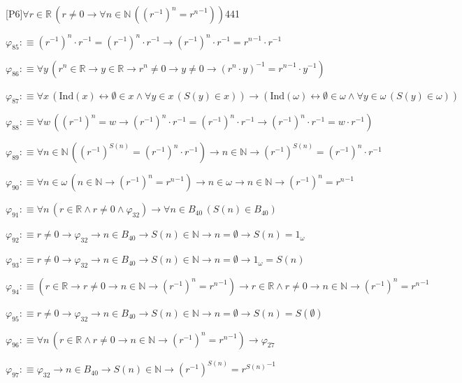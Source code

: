 \begin{fullproof}{[P6]}{$\forall r \in \mathbb{R}\,(r \neq 0 \to \forall n \in \mathbb{N}\,({{(r^{-1})}^{n}} = {{r}^{n}}^{-1}))$}{441}
\begin{abbrevlist}
\item $\varphi_{85} :\equiv {{(r^{-1})}^{n}} \cdot r^{-1} = {{(r^{-1})}^{n}} \cdot r^{-1} \to {{(r^{-1})}^{n}} \cdot r^{-1} = {{r}^{n}}^{-1} \cdot r^{-1}$
\item $\varphi_{86} :\equiv \forall y\,({{r}^{n}} \in \mathbb{R} \to y \in \mathbb{R} \to {{r}^{n}} \neq 0 \to y \neq 0 \to ({{r}^{n}} \cdot y)^{-1} = {{r}^{n}}^{-1} \cdot y^{-1})$
\item $\varphi_{87} :\equiv \forall x\,(\mathrm{Ind}(x) \leftrightarrow \emptyset \in x \land \forall y \in x\,(S(y) \in x)) \to (\mathrm{Ind}(\omega) \leftrightarrow \emptyset \in \omega \land \forall y \in \omega\,(S(y) \in \omega))$
\item $\varphi_{88} :\equiv \forall w\,({{(r^{-1})}^{n}} = w \to {{(r^{-1})}^{n}} \cdot r^{-1} = {{(r^{-1})}^{n}} \cdot r^{-1} \to {{(r^{-1})}^{n}} \cdot r^{-1} = w \cdot r^{-1})$
\item $\varphi_{89} :\equiv \forall n \in \mathbb{N}\,({{(r^{-1})}^{S(n)}} = {{(r^{-1})}^{n}} \cdot r^{-1}) \to n \in \mathbb{N} \to {{(r^{-1})}^{S(n)}} = {{(r^{-1})}^{n}} \cdot r^{-1}$
\item $\varphi_{90} :\equiv \forall n \in \omega\,(n \in \mathbb{N} \to {{(r^{-1})}^{n}} = {{r}^{n}}^{-1}) \to n \in \omega \to n \in \mathbb{N} \to {{(r^{-1})}^{n}} = {{r}^{n}}^{-1}$
\item $\varphi_{91} :\equiv \forall n\,(r \in \mathbb{R} \land r \neq 0 \land \varphi_{32}) \to \forall n \in B_{40}\,(S(n) \in B_{40})$
\item $\varphi_{92} :\equiv r \neq 0 \to \varphi_{32} \to n \in B_{40} \to S(n) \in \mathbb{N} \to n = \emptyset \to S(n) = 1_{\omega}$
\item $\varphi_{93} :\equiv r \neq 0 \to \varphi_{32} \to n \in B_{40} \to S(n) \in \mathbb{N} \to n = \emptyset \to 1_{\omega} = S(n)$
\item $\varphi_{94} :\equiv (r \in \mathbb{R} \to r \neq 0 \to n \in \mathbb{N} \to {{(r^{-1})}^{n}} = {{r}^{n}}^{-1}) \to r \in \mathbb{R} \land r \neq 0 \to n \in \mathbb{N} \to {{(r^{-1})}^{n}} = {{r}^{n}}^{-1}$
\item $\varphi_{95} :\equiv r \neq 0 \to \varphi_{32} \to n \in B_{40} \to S(n) \in \mathbb{N} \to n = \emptyset \to S(n) = S(\emptyset)$
\item $\varphi_{96} :\equiv \forall n\,(r \in \mathbb{R} \land r \neq 0 \to n \in \mathbb{N} \to {{(r^{-1})}^{n}} = {{r}^{n}}^{-1}) \to \varphi_{27}$
\item $\varphi_{97} :\equiv \varphi_{32} \to n \in B_{40} \to S(n) \in \mathbb{N} \to {{(r^{-1})}^{S(n)}} = {{r}^{S(n)}}^{-1}$

\end{abbrevlist}
\end{fullproof}
